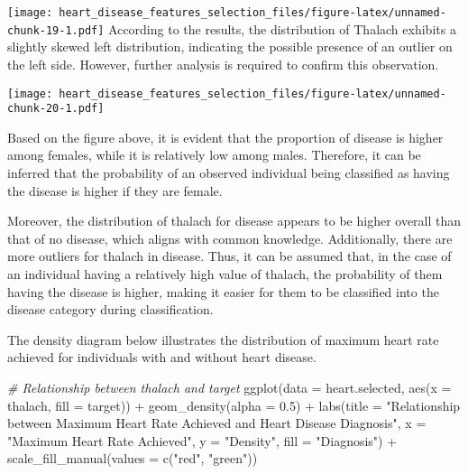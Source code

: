\documentclass[
]{article}
\newenvironment{Shaded}{\begin{snugshade}}{\end{snugshade}}
\newcommand{\AttributeTok}[1]{\textcolor[rgb]{0.77,0.63,0.00}{#1}}
\newcommand{\CommentTok}[1]{\textcolor[rgb]{0.56,0.35,0.01}{\textit{#1}}}
\newcommand{\FloatTok}[1]{\textcolor[rgb]{0.00,0.00,0.81}{#1}}
\newcommand{\FunctionTok}[1]{\textcolor[rgb]{0.00,0.00,0.00}{#1}}
\newcommand{\NormalTok}[1]{#1}
\newcommand{\SpecialCharTok}[1]{\textcolor[rgb]{0.00,0.00,0.00}{#1}}
\newcommand{\StringTok}[1]{\textcolor[rgb]{0.31,0.60,0.02}{#1}}
\begin{document}
\texttt{[image: heart\_disease\_features\_selection\_files/figure-latex/unnamed-chunk-19-1.pdf]}
According to the results, the distribution of Thalach exhibits a
slightly skewed left distribution, indicating the possible presence of
an outlier on the left side. However, further analysis is required to
confirm this observation.

\begin{Shaded}
\end{Shaded}

\texttt{[image: heart\_disease\_features\_selection\_files/figure-latex/unnamed-chunk-20-1.pdf]}

Based on the figure above, it is evident that the proportion of disease
is higher among females, while it is relatively low among males.
Therefore, it can be inferred that the probability of an observed
individual being classified as having the disease is higher if they are
female.

Moreover, the distribution of thalach for disease appears to be higher
overall than that of no disease, which aligns with common knowledge.
Additionally, there are more outliers for thalach in disease. Thus, it
can be assumed that, in the case of an individual having a relatively
high value of thalach, the probability of them having the disease is
higher, making it easier for them to be classified into the disease
category during classification.

The density diagram below illustrates the distribution of maximum heart
rate achieved for individuals with and without heart disease.

\begin{Shaded}
\begin{Highlighting}[]
\CommentTok{\# Relationship between thalach and target}
\FunctionTok{ggplot}\NormalTok{(}\AttributeTok{data =}\NormalTok{ heart.selected, }\FunctionTok{aes}\NormalTok{(}\AttributeTok{x =}\NormalTok{ thalach, }\AttributeTok{fill =}\NormalTok{ target)) }\SpecialCharTok{+}
  \FunctionTok{geom\_density}\NormalTok{(}\AttributeTok{alpha =} \FloatTok{0.5}\NormalTok{) }\SpecialCharTok{+}
  \FunctionTok{labs}\NormalTok{(}\AttributeTok{title =} \StringTok{"Relationship between Maximum Heart Rate Achieved and Heart Disease Diagnosis"}\NormalTok{,}
       \AttributeTok{x =} \StringTok{"Maximum Heart Rate Achieved"}\NormalTok{, }\AttributeTok{y =} \StringTok{"Density"}\NormalTok{, }\AttributeTok{fill =} \StringTok{"Diagnosis"}\NormalTok{) }\SpecialCharTok{+}
  \FunctionTok{scale\_fill\_manual}\NormalTok{(}\AttributeTok{values =} \FunctionTok{c}\NormalTok{(}\StringTok{"red"}\NormalTok{, }\StringTok{"green"}\NormalTok{))}
\end{Highlighting}
\end{Shaded}
\end{document}
